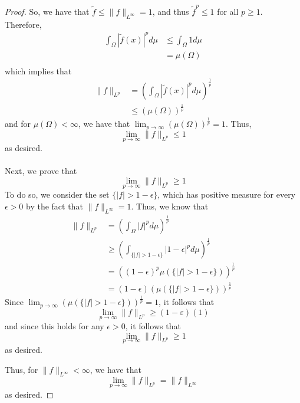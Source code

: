 \documentclass[fontsize=11pt]{scrartcl} %
\numberwithin{equation}{section} %
\numberwithin{figure}{section} %
\numberwithin{table}{section} %
\begin{document}
\begin{proof}
    So, we have that $\tilde{f} \leq \|f\|_{L^{\infty}} = 1$, and thus
    $\tilde{f}^p\leq 1$ for all $p\geq 1$. Therefore,
    \[
        \begin{aligned}
            \int_{\Omega}|\tilde{f}(x)|^pd\mu &\leq \int_{\Omega}1d\mu\\
                                            &=\mu(\Omega)\\
        \end{aligned}
    \]
    which implies that
    \[
        \begin{aligned}
        \|f\|_{L^p} &=
        \left(\int_{\Omega}|\tilde{f}(x)|^pd\mu\right)^{\frac{1}{p}}\\
            &\leq (\mu(\Omega))^{\frac{1}{p}}
        \end{aligned}
    \]
    and for $\mu(\Omega)<\infty$, we have that
    $\lim_{p\to\infty}(\mu(\Omega))^{\frac{1}{p}} = 1$.
    Thus,
    \[
        \lim_{p\to\infty}\|f\|_{L^p} \leq 1
    \]
    as desired.
    \\
    \\
    Next, we prove that
    \[
        \lim_{p\to\infty}\|f\|_{L^p} \geq 1
    \]
    To do so, we consider the set $\{|f|>1-\epsilon\}$, which has positive
    measure for every $\epsilon>0$ by the fact that $\|f\|_{L^{\infty}} = 1$.
    Thus, we know that
    \[
        \begin{aligned}
            \|f\|_{L^p} &=\left(\int_{\Omega}|f|^pd\mu\right)^{\frac{1}{p}}\\
                        &\geq
                        \left(\int_{\{|f|>1-\epsilon\}}|1-\epsilon|^pd\mu\right)^{\frac{1}{p}}\\
                        &=((1-\epsilon)^p\mu(\{|f|>1-\epsilon\}))^{\frac{1}{p}}\\
                        &=(1-\epsilon)(\mu(\{|f|>1-\epsilon\}))^{\frac{1}{p}}
        \end{aligned}
    \]
    Since $\lim_{p\to\infty}(\mu(\{|f|>1-\epsilon\}))^{\frac{1}{p}}
    = 1$, it follows that
    \[
        \lim_{p\to\infty}\|f\|_{L^p} \geq (1-\varepsilon)(1)
    \]
    and since this holds for any $\epsilon>0$, it follows that
    \[
        \lim_{p\to\infty}\|f\|_{L^p} \geq 1
    \]
    as desired.

    Thus, for $\|f\|_{L^{\infty}} < \infty$, we have that
    \[
        \lim_{p\to\infty}\|f\|_{L^p} = \|f\|_{L^{\infty}}
    \]
    as desired.


\end{proof}
\end{document}
